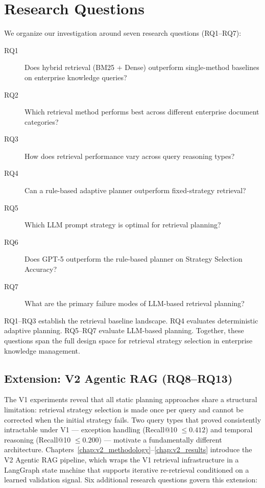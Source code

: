 \section{Research Questions}
\label{sec:intro_rqs}

We organize our investigation around seven research questions (RQ1--RQ7):

\begin{description}
    \item[RQ1] Does hybrid retrieval (BM25 + Dense) outperform single-method baselines on enterprise knowledge queries?
    \item[RQ2] Which retrieval method performs best across different enterprise document categories?
    \item[RQ3] How does retrieval performance vary across query reasoning types?
    \item[RQ4] Can a rule-based adaptive planner outperform fixed-strategy retrieval?
    \item[RQ5] Which LLM prompt strategy is optimal for retrieval planning?
    \item[RQ6] Does GPT-5 outperform the rule-based planner on Strategy Selection Accuracy?
    \item[RQ7] What are the primary failure modes of LLM-based retrieval planning?
\end{description}

RQ1--RQ3 establish the retrieval baseline landscape. RQ4 evaluates deterministic adaptive planning. RQ5--RQ7 evaluate LLM-based planning. Together, these questions span the full design space for retrieval strategy selection in enterprise knowledge management.

\subsection*{Extension: V2 Agentic RAG (RQ8--RQ13)}
\label{sec:intro_rqs_v2}

The V1 experiments reveal that all static planning approaches share a structural limitation: retrieval strategy selection is made once per query and cannot be corrected when the initial strategy fails. Two query types that proved consistently intractable under V1 --- exception handling (Recall@10 $\leq 0.412$) and temporal reasoning (Recall@10 $\leq 0.200$) --- motivate a fundamentally different architecture. Chapters~\ref{chap:v2_methodology}--\ref{chap:v2_results} introduce the V2 Agentic RAG pipeline, which wraps the V1 retrieval infrastructure in a LangGraph state machine that supports iterative re-retrieval conditioned on a learned validation signal. Six additional research questions govern this extension:

